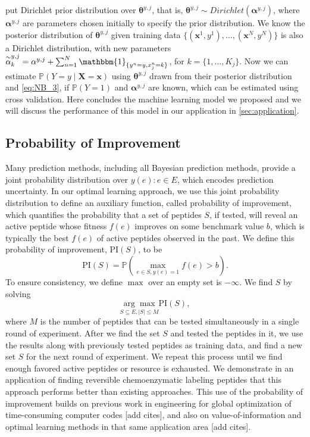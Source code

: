 \documentclass[11pt]{article}
\newcommand{\Prob}{\mathbb{P}}
\newcommand{\PI}{\text{PI}}
\begin{document}
put Dirichlet prior distribution over $\bm{\theta}^{y, j}$, that is,
$\bm{\theta}^{y, j} \sim Dirichlet(\bm{\alpha}^{y, j})$, where $\bm{\alpha}^{y, j}$
are parameters chosen initially to specify the prior distribution. We know the
posterior distribution of $\bm{\theta}^{y, j}$ given training data $\{(\bm{x}^1, y^1), 
\ldots, (\bm{x}^N, y^N)\}$ is also a Dirichlet distribution, with new parameters
$\overset{\sim}{\alpha}^{y, j}_k = \alpha^{y, j} + \sum_{n=1}^N \mathbbm{1}_{\{y^n = y, x^n_j = k\}}$,
for $k = \{1, \ldots, K_j\}$. Now we can estimate $\Prob(Y = y \mid \bm{X} = \bm{x})$
using $\bm{\theta}^{y, j}$ drawn from their posterior distribution and \eqref{eq:NB_3},
if $\Prob(Y = 1)$ and $\bm{\alpha}^{y, j}$ are known, which can be estimated using
cross validation. Here concludes the machine learning model we proposed and we will
discuss the performance of this model in our application in \ref{sec:application}.

\subsection{Probability of Improvement} \label{sec:prob improvement}
Many prediction methods, including all Bayesian prediction methods, provide a joint probability distribution over
$y(e): e \in E$, which encodes prediction uncertainty. 
In our optimal learning approach, we use this joint probability distribution to define an auxiliary function, called probability of improvement, which quantifies the probability that a set of peptides $S$, if tested, will reveal an active peptide whose fitness $f(e)$ improves on some benchmark value $b$, which is typically the best $f(e)$ of active peptides observed in the past. 
We define this probability of improvement, $\PI(S)$, to be
\begin{equation}
  \PI(S) = \Prob \left( \max_{e \in S, y(e)=1} f(e) > b \right).
  \label{}
\end{equation}
To ensure consistency, we define $\max$ over an empty set is $-\infty$. We find $S$ by solving
\begin{equation}
  \underset{S \subseteq E, |S| \leq M}{\arg\max} \PI(S),
  \label{eq:opt PI}
\end{equation}
where $M$ is the number of peptides that can be tested simultaneously in a single round of experiment. 
After we find the set $S$ and tested the peptides in it, we use the results along with previously
tested peptides as training data, and find a new set $S$ for the next round of experiment. We repeat this
process until we find enough favored active peptides or resource is exhausted. We demonstrate
in an application of finding reversible chemoenzymatic labeling peptides
that this approach performs better than existing approaches.
This use of the probability of improvement builds on previous work in engineering 
for global optimization of time-consuming computer codes [add cites], and also on
value-of-information and optimal learning methods in that same application area 
[add cites].
\end{document}
